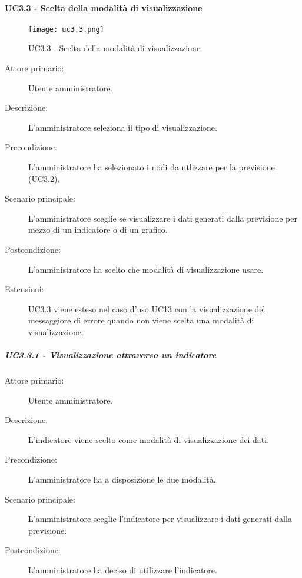 \paragraph{UC3.3 - Scelta della modalità di visualizzazione}%
\label{sssec:uc3.3}

\begin{figure}[h!]
  \begin{center}
    \texttt{[image: uc3.3.png]}\\
    \caption{UC3.3 - Scelta della modalità di visualizzazione}%
    \label{fig:uc3.3}
  \end{center}
\end{figure}

\begin{description}
  \item[Attore primario:] Utente amministratore.
  \item[Descrizione:] L'amministratore seleziona il tipo di visualizzazione.
  \item[Precondizione:]  L'amministratore ha selezionato i nodi da utlizzare per la previsione (UC3.2).
  \item[Scenario principale:] L'amministratore sceglie se visualizzare i dati generati dalla previsione per mezzo di un indicatore o di un grafico.
  \item[Postcondizione:] L'amministratore ha scelto che modalità di visualizzazione usare.
  \item[Estensioni:] UC3.3 viene esteso nel caso d'uso UC13 con la visualizzazione del messaggiore di errore quando non viene scelta una modalità di visualizzazione.
\end{description}

\subparagraph{UC3.3.1 - Visualizzazione attraverso un indicatore}
\label{sssec:uc3.3.1}
\begin{description}
  \item[Attore primario:] Utente amministratore.
  \item[Descrizione:] L'indicatore viene scelto come modalità di visualizzazione dei dati.
  \item[Precondizione:] L'amministratore ha a disposizione le due modalità.
  \item[Scenario principale:] L'amministratore sceglie l'indicatore per visualizzare i dati generati dalla previsione.
  \item[Postcondizione:] L'amministratore ha deciso di utilizzare l'indicatore.
\end{description}

